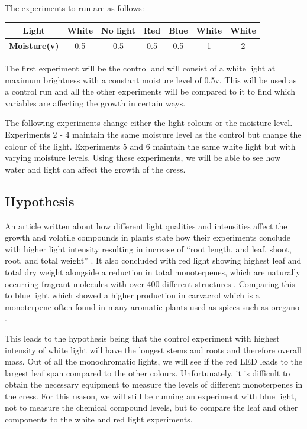 The experiments to run are as follows:

\begin{center}
\begin{tabular}{| c | c | c | c | c | c | c |} 
    \hline
    \textbf{Light} & White & No light & Red & Blue & White & White\\
    \hline
    \textbf{Moisture(v)} & 0.5 & 0.5 & 0.5 & 0.5 & 1 & 2\\
    \hline
\end{tabular}
\end{center}

The first experiment will be the control and will consist of a white light at maximum brightness with a constant moisture level of 0.5v. This will be used as a control run and all the other experiments will be compared to it to find which variables are affecting the growth in certain ways.

The following experiments change either the light colours or the moisture level. Experiments 2 - 4 maintain the same moisture level as the control but change the colour of the light. Experiments 5 and 6 maintain the same white light but with varying moisture levels. Using these experiments, we will be able to see how water and light can affect the growth of the cress.

\subsection{Hypothesis}

An article written about how different light qualities and intensities affect the growth and volatile compounds in plants state how their experiments conclude with higher light intensity resulting in increase of “root length, and leaf, shoot, root, and total weight” \cite{bayir2019plant}. It also concluded with red light showing highest leaf and total dry weight alongside a reduction in total monoterpenes, which are naturally occurring fragrant molecules with over 400 different structures \cite{ALCANTARA2011309}. Comparing this to blue light which showed a higher production in carvacrol which is a monoterpene often found in many aromatic plants used as spices such as oregano \cite{bayir2019plant}.

This leads to the hypothesis being that the control experiment with highest intensity of white light will have the longest stems and roots and therefore overall mass. Out of all the monochromatic lights, we will see if the red LED leads to the largest leaf span compared to the other colours. Unfortunately, it is difficult to obtain the necessary equipment to measure the levels of different monoterpenes in the cress. For this reason, we will still be running an experiment with blue light, not to measure the chemical compound levels, but to compare the leaf and other components to the white and red light experiments.

